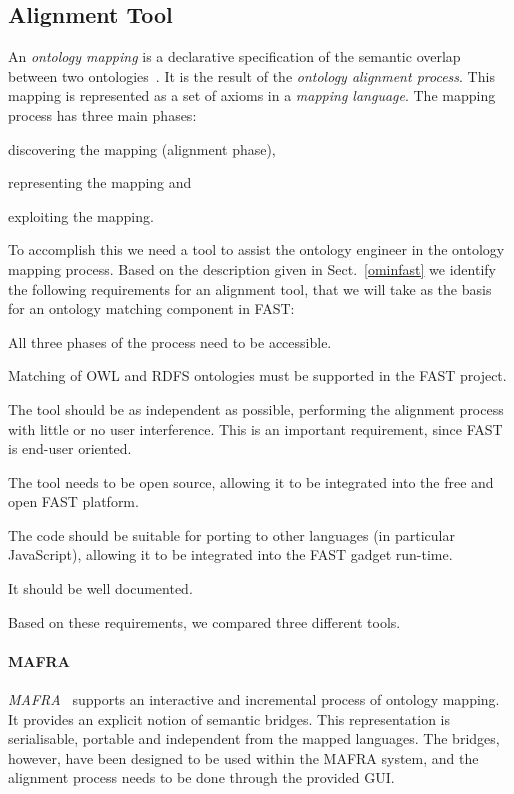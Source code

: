 \subsection{Alignment Tool}
\label{alignmenttool}

An \emph{ontology mapping} is a declarative specification of the semantic overlap between two ontologies~\cite{debruin2005wsml}. It is the result of the \emph{ontology alignment process}. This mapping is represented as a set of axioms in a \emph{mapping language}. The mapping process has three main phases:
\begin{inparaenum}[(1)]
    \item discovering the mapping (alignment phase), 
    \item representing the mapping and 
    \item exploiting the mapping.
\end{inparaenum}  

To accomplish this we need a tool to assist the ontology engineer in the ontology mapping process.
Based on the description given in Sect.~\ref{ominfast} we identify the following requirements for an alignment tool, that we will take as the basis for an ontology matching component in FAST:
\begin{inparaenum}[(i)]
\item All three phases of the process need to be accessible.
\item Matching of OWL and RDFS ontologies must be supported in the FAST project.
\item The tool should be as independent as possible, performing the alignment process with little or no user interference. This is an important requirement, since FAST is end-user oriented.
\item The tool needs to be open source, allowing it to be integrated into the free and open FAST platform.
\item The code should be suitable for porting to other languages (in particular JavaScript), allowing it to be integrated into the FAST gadget run-time.
\item It should be well documented.
\end{inparaenum}

Based on these requirements, we compared three different tools. 
\paragraph{MAFRA} \emph{MAFRA}~\cite{maedche2002mafra} supports an interactive and incremental process of ontology mapping. It provides an explicit notion of semantic bridges. This representation is serialisable, portable and independent from the mapped languages. The bridges, however, have been designed to be used within the MAFRA system, and the alignment process needs to be done through the provided GUI. 

